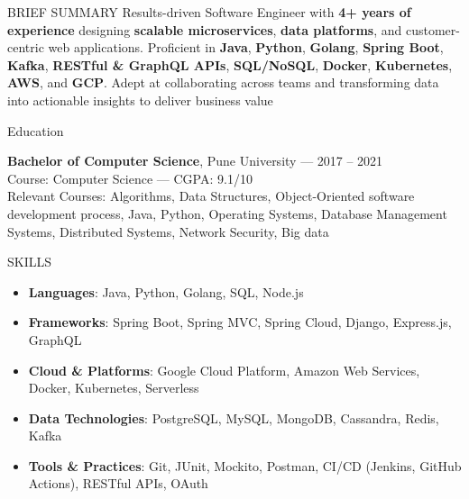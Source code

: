 \documentclass{resume} %
\begin{document}

\begin{rSection}{BRIEF SUMMARY}
\linespread{1.0}
{ Results-driven Software Engineer with \textbf{4+ years of experience} designing \textbf{scalable microservices}, \textbf{data platforms}, and customer-centric web applications. Proficient in \textbf{Java}, \textbf{Python}, \textbf{Golang}, \textbf{Spring Boot}, \textbf{Kafka}, \textbf{RESTful \& GraphQL APIs}, \textbf{SQL/NoSQL}, \textbf{Docker}, \textbf{Kubernetes}, \textbf{AWS}, and \textbf{GCP}. Adept at collaborating across teams and transforming data into actionable insights to deliver business value }


\end{rSection}

\begin{rSection}{Education}

{\bf Bachelor  of Computer Science}, Pune University --- 2017 -- 2021\\
Course: Computer Science --- CGPA: 9.1/10\\
Relevant Courses: Algorithms, Data Structures, Object-Oriented software development process, Java, Python, Operating  Systems, Database Management Systems, Distributed Systems, Network Security, Big data



\end{rSection}

\begin{rSection}{SKILLS}
\begin{itemize}
    \item \textbf{Languages}: Java, Python, Golang, SQL, Node.js
    \item \textbf{Frameworks}: Spring Boot, Spring MVC, Spring Cloud, Django, Express.js, GraphQL
    \item \textbf{Cloud \& Platforms}: Google Cloud Platform, Amazon Web Services, Docker, Kubernetes, Serverless
    \item \textbf{Data Technologies}: PostgreSQL, MySQL, MongoDB, Cassandra, Redis, Kafka
    \item \textbf{Tools \& Practices}: Git, JUnit, Mockito, Postman, CI/CD (Jenkins, GitHub Actions), RESTful APIs, OAuth
\end{itemize}
\end{rSection}
\end{document}
